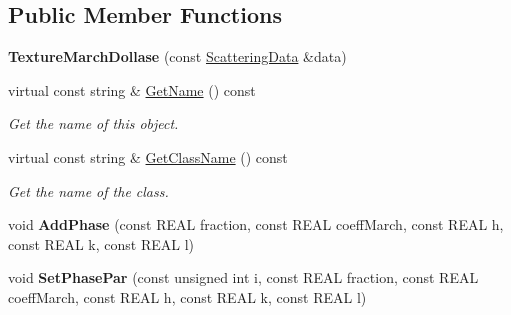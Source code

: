 \subsection*{Public Member Functions}
\begin{DoxyCompactItemize}
\item 
\mbox{\label{class_obj_cryst_1_1_texture_march_dollase_a68c09384efe47c70c8f43fb877dfc571}} 
{\bfseries Texture\+March\+Dollase} (const \mbox{\hyperlink{class_obj_cryst_1_1_scattering_data}{Scattering\+Data}} \&data)
\item 
\mbox{\label{class_obj_cryst_1_1_texture_march_dollase_a56b5357e85ab8b45a4a4e917f1ef74cb}} 
virtual const string \& \mbox{\hyperlink{class_obj_cryst_1_1_texture_march_dollase_a56b5357e85ab8b45a4a4e917f1ef74cb}{Get\+Name}} () const
\begin{DoxyCompactList}\small\item\em Get the name of this object. \end{DoxyCompactList}\item 
\mbox{\label{class_obj_cryst_1_1_texture_march_dollase_a69afa7e8387b773c5362904b2a4ec516}} 
virtual const string \& \mbox{\hyperlink{class_obj_cryst_1_1_texture_march_dollase_a69afa7e8387b773c5362904b2a4ec516}{Get\+Class\+Name}} () const
\begin{DoxyCompactList}\small\item\em Get the name of the class. \end{DoxyCompactList}\item 
\mbox{\label{class_obj_cryst_1_1_texture_march_dollase_a88fe286c7547b841edecc905b1a95b84}} 
void {\bfseries Add\+Phase} (const R\+E\+AL fraction, const R\+E\+AL coeff\+March, const R\+E\+AL h, const R\+E\+AL k, const R\+E\+AL l)
\item 
\mbox{\label{class_obj_cryst_1_1_texture_march_dollase_ae5cb3330830822cb4ce7d23083296c53}} 
void {\bfseries Set\+Phase\+Par} (const unsigned int i, const R\+E\+AL fraction, const R\+E\+AL coeff\+March, const R\+E\+AL h, const R\+E\+AL k, const R\+E\+AL l)
\item 
\mbox{\label{class_obj_cryst_1_1_texture_march_dollase_a7290f7949ee2c4e302017f24d3994da1}} 

\end{DoxyCompactItemize}
